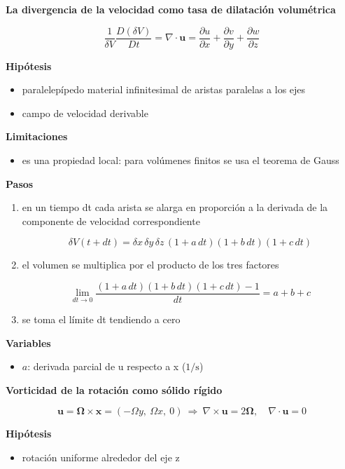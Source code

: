 \documentclass[10pt,openany]{book}
\begin{document}
\begin{tcolorbox}[title={Desarrollos del modelo}, studiumdef, breakable]

\noindent\textbf{La divergencia de la velocidad como tasa de dilatación volumétrica}

\[
\frac{1}{\delta V}\frac{D(\delta V)}{Dt} = \nabla\cdot\mathbf{u} = \frac{\partial u}{\partial x} + \frac{\partial v}{\partial y} + \frac{\partial w}{\partial z}
\]

\noindent\textbf{Hipótesis}
\begin{itemize}
\item paralelepípedo material infinitesimal de aristas paralelas a los ejes
\item campo de velocidad derivable
\end{itemize}

\noindent\textbf{Limitaciones}
\begin{itemize}
\item es una propiedad local: para volúmenes finitos se usa el teorema de Gauss
\end{itemize}

\noindent\textbf{Pasos}
\begin{enumerate}
\item
en un tiempo dt cada arista se alarga en proporción a la derivada de la componente de velocidad correspondiente

\[
\delta V(t + dt) = \delta x\,\delta y\,\delta z\,(1 + a\,dt)(1 + b\,dt)(1 + c\,dt)
\]
\item
el volumen se multiplica por el producto de los tres factores

\[
\lim_{dt\to 0}\frac{(1 + a\,dt)(1 + b\,dt)(1 + c\,dt) - 1}{dt} = a + b + c
\]
\item
se toma el límite dt tendiendo a cero
\end{enumerate}

\noindent\textbf{Variables}
\begin{itemize}
\item $a$: derivada parcial de u respecto a x ($\mathrm{1/s}$)
\end{itemize}



\noindent\textbf{Vorticidad de la rotación como sólido rígido}

\[
\mathbf{u} = \boldsymbol{\Omega}\times\mathbf{x} = (-\Omega y,\ \Omega x,\ 0)\ \Rightarrow\ \nabla\times\mathbf{u} = 2\boldsymbol{\Omega},\quad \nabla\cdot\mathbf{u} = 0
\]

\noindent\textbf{Hipótesis}
\begin{itemize}
\item rotación uniforme alrededor del eje z
\end{itemize}


\end{tcolorbox}
\end{document}
